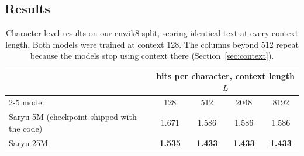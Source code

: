 \documentclass[10pt]{article}
\begin{document}
\subsection{Results}

\begin{table}[t]
\centering
\small
\begin{tabular}{@{}lcccc@{}}
\toprule
 & \multicolumn{4}{c}{bits per character, context length $L$} \\
\cmidrule(l){2-5}
model & 128 & 512 & 2048 & 8192 \\
\midrule
Saryu 5M (checkpoint shipped with the code) & 1.671 & 1.586 & 1.586 & 1.586 \\
Saryu 25M & \textbf{1.535} & \textbf{1.433} & \textbf{1.433} & \textbf{1.433} \\
\bottomrule
\end{tabular}
\caption{Character-level results on our enwik8 split, scoring identical text at every context length.
Both models were trained at context 128. The columns beyond 512 repeat because the models stop using
context there (Section~\ref{sec:context}).}
\label{tab:bpc}
\end{table}
\end{document}

